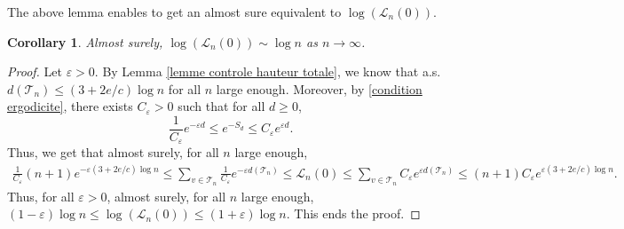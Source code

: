 \documentclass[11pt]{article}
\newtheorem{corollary}[theorem]{Corollary}
\numberwithin{equation}{section}
\def\vp{\varepsilon}
\def \T{\mathcal{T}}
\def \cL{\mathcal{L}}
\begin{document}
The above lemma enables to get an almost sure equivalent to $\log (\cL_n(0)) $.
\begin{corollary}\label{cor controle transformee de Laplace}
	Almost surely, $ \log (\cL_n(0)) \sim \log n$ as $n\to \infty$.
\end{corollary}
\begin{proof}
	Let $\vp>0$. By Lemma \ref{lemme controle hauteur totale}, we know that a.s.\@ $d(\T_n)\le (3+2e/c)\log n$ for all $n$ large enough. Moreover, by \eqref{condition ergodicite}, there exists $C_\vp >0$ such that for all $d \ge 0$,
	\[
	\frac{1}{C_\vp} e^{-\vp d} \le e^{-S_d} \le C_\vp e^{\vp d}.
	\]
	Thus, we get that almost surely, for all $n$ large enough,
	\begin{multline*}
	\frac{1}{C_\vp} (n+1)e^{-\vp(3+2e/c)\log n }\le \sum_{v \in \T_n} \frac{1}{C_\vp} e^{-\vp d(\T_n)} \le \cL_n(0)\le \sum_{v \in \T_n} C_\vp e^{\vp d(\T_n)} \le (n+1) C_\vp e^{\vp(3+2e/c)\log n }.
	\end{multline*}
	Thus, for all $\vp>0$, almost surely, for all $n$ large enough, $(1-\vp) \log n \le \log (\cL_n(0)) \le (1+\vp) \log n$. This ends the proof.
\end{proof}
\end{document}

